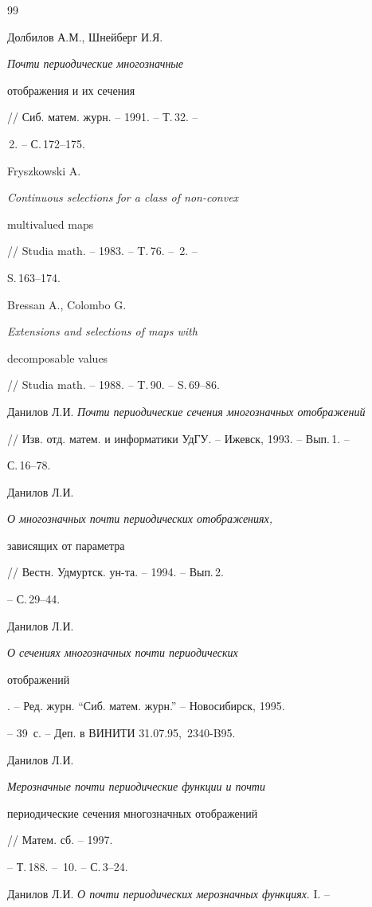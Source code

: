 \begin{thebibliography}{99}







Долбилов А.М., Шнейберг И.Я. {\em Почти периодические многозначные


отображения и их сечения} // Сиб. матем. журн. -- 1991. -- Т.\,32. --


\No\,2. -- С.\,172--175.




Fryszkowski A. {\em Continuous selections for a class of non-convex


multivalued maps} // Studia math. -- 1983. -- T.\,76. -- \No\,2. --


S.\,163--174.




Bressan A., Colombo G. {\em Extensions and selections of maps with


decomposable values} // Studia math. -- 1988. -- T.\,90. -- S.\,69--86.




Данилов Л.И. {\em Почти периодические сечения многозначных отображений}


// Изв. отд. матем. и информатики УдГУ. -- Ижевск, 1993. -- Вып.\,1. --


С.\,16--78.




Данилов Л.И. {\em О многозначных почти периодических отображениях,


зависящих от параметра} // Вестн. Удмуртск. ун-та. -- 1994. -- Вып.\,2.


-- С.\,29--44.




Данилов Л.И. {\em О сечениях многозначных почти периодических


отображений}. -- Ред. журн. ``Сиб. матем. журн.'' -- Новосибирск, 1995.


-- 39~с. -- Деп. в ВИНИТИ 31.07.95, \No\,2340-B95.




Данилов Л.И. {\em Мерозначные почти периодические функции и почти


периодические сечения многозначных отображений} // Матем. сб. -- 1997.


-- Т.\,188. -- \No\,10. -- С.\,3--24.




Данилов Л.И. {\em О почти периодических мерозначных функциях}. I. --



\end{thebibliography}
